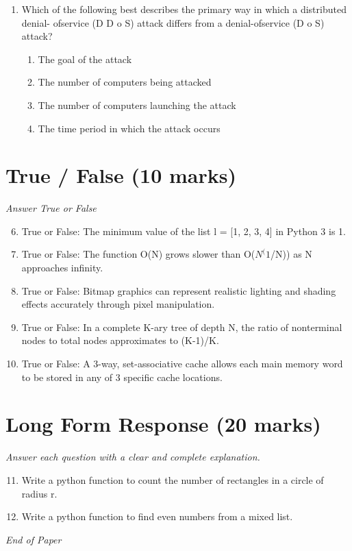 \documentclass[12pt]{article}
\begin{document}
\begin{enumerate}[label=\arabic*.]
\begin{enumerate}[label=(\alph*)]
\end{enumerate}
\item Which of the following best describes the primary way in which a distributed denial- ofservice (D D o S) attack differs from a denial-ofservice (D o S) attack?
\begin{enumerate}[label=(\alph*)]
    \item The goal of the attack
    \item The number of computers being attacked
    \item The number of computers launching the attack
    \item The time period in which the attack occurs
\end{enumerate}
\end{enumerate}

\section*{True / False (10 marks)}
\textit{Answer True or False}
\begin{enumerate}[label=\arabic*.]
\setcounter{enumi}{5}
\item True or False: The minimum value of the list l = [1, 2, 3, 4] in Python 3 is 1.
\item True or False: The function O(N) grows slower than O($N^(1$/N)) as N approaches infinity.
\item True or False: Bitmap graphics can represent realistic lighting and shading effects accurately through pixel manipulation.
\item True or False: In a complete K-ary tree of depth N, the ratio of nonterminal nodes to total nodes approximates to (K-1)/K.
\item True or False: A 3-way, set-associative cache allows each main memory word to be stored in any of 3 specific cache locations.
\end{enumerate}

\section*{Long Form Response (20 marks)}
\textit{Answer each question with a clear and complete explanation.}
\begin{enumerate}[label=\arabic*.]
\setcounter{enumi}{10}
\item Write a python function to count the number of rectangles in a circle of radius r.
\item Write a python function to find even numbers from a mixed list.
\end{enumerate}

\vfill
\noindent\textit{End of Paper}
\end{document}
